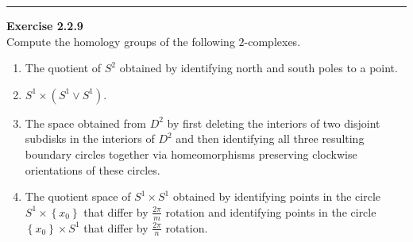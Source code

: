 \documentclass[a4paper, 12pt]{article}
\newenvironment{problem}[2][Exercise]
    { \begin{mdframed}[backgroundcolor=gray!20] \textbf{#1 #2} \\}
    {  \end{mdframed}}
\begin{document}
\noindent\rule{7in}{2.8pt}
\begin{problem}{2.2.9}
Compute the homology groups of the following \(2\)-complexes.
\begin{enumerate}
\item The quotient of \(S^2\) obtained by identifying north and south poles to a point.
\item \(S^1\times (S^1\vee S^1)\).
\item The space obtained from \(D^2\) by first deleting the interiors of two disjoint subdisks in the interiors of \(D^2\) and then identifying all three resulting boundary circles together 
      via homeomorphisms preserving clockwise orientations of these circles.
\item The quotient space of \(S^1\times S^1\) obtained by identifying points in the circle \(S^1\times \left\{ x_0 \right\}\) that differ by \(\frac{2\pi}{m}\) rotation and identifying points in the circle \(\left\{ x_0 \right\}\times S^1\) that 
    differ by \(\frac{2\pi}{n}\) rotation. 
\end{enumerate}
\end{problem}
\end{document}
